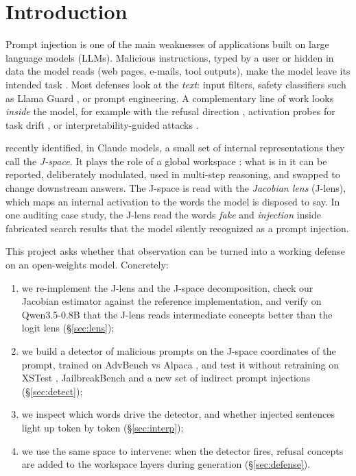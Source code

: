 \section{Introduction}

Prompt injection is one of the main weaknesses of applications built on large language
models (LLMs). Malicious instructions, typed by a user or hidden in data the model reads
(web pages, e-mails, tool outputs), make the model leave its intended task
\citep{perez2022ignore,greshake2023indirect}. Most defenses look at the \emph{text}: input
filters, safety classifiers such as Llama Guard \citep{inan2023llamaguard}, or prompt
engineering. A complementary line of work looks \emph{inside} the model, for example with
the refusal direction \citep{arditi2024refusal}, activation probes for task drift
\citep{abdelnabi2024drift}, or interpretability-guided attacks \citep{winninger2025mechanistic}.

\citet{gurnee2026workspace} recently identified, in Claude models, a small set of
internal representations they call the \emph{J-space}. It plays the role of a global
workspace \citep{baars1988cognitive}: what is in it can be reported, deliberately modulated,
used in multi-step reasoning, and swapped to change downstream answers. The J-space is read
with the \emph{Jacobian lens} (J-lens), which maps an internal activation to the words the
model is disposed to say. In one auditing case study, the J-lens read the words
\textit{fake} and \textit{injection} inside fabricated search results that the model
silently recognized as a prompt injection.

This project asks whether that observation can be turned into a working defense on an
open-weights model. Concretely:
\begin{enumerate}
  \item we re-implement the J-lens and the J-space decomposition, check our Jacobian
        estimator against the reference implementation, and verify on Qwen3.5-0.8B that the
        J-lens reads intermediate concepts better than the logit lens (\S\ref{sec:lens});
  \item we build a detector of malicious prompts on the J-space coordinates of the prompt,
        trained on AdvBench \citep{zou2023universal} vs Alpaca \citep{alpaca}, and test it
        without retraining on XSTest \citep{rottger2024xstest}, JailbreakBench
        \citep{chao2024jailbreakbench} and a new set of indirect prompt injections
        (\S\ref{sec:detect});
  \item we inspect which words drive the detector, and whether injected sentences light up
        token by token (\S\ref{sec:interp});
  \item we use the same space to intervene: when the detector fires, refusal concepts are
        added to the workspace layers during generation (\S\ref{sec:defense}).
\end{enumerate}

